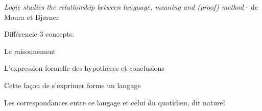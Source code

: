  	
 	



\begin{frame}
	\pause
	 \textit{Logic studies the relationship between language, meaning and (proof) method} - de Moura et Bjørner\pause
	 \vspace{0.1cm}
	
	 Différencie 3 concepts:\pause
	 
	\begin{description}[labelindent=6pt,style=multiline,leftmargin=1.3in]
		 \setlength\itemsep{1.4em}

		\item[Preuve] Le raisonnement \pause
		\item[Sens] L'expression formelle des hypothèses et conclusions\pause
		\item[] Cette façon de s'exprimer forme un langage\pause
		\item[Langage] Les correspondances entre ce langage et celui du quotidien, dit naturel


	\end{description}


\end{frame}
 	
 	
 	

